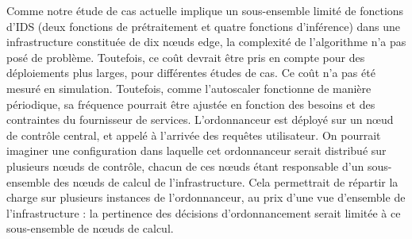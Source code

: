 {Comme notre étude de cas actuelle implique un sous-ensemble limité de fonctions d'IDS (deux fonctions de prétraitement et quatre fonctions d'inférence) dans une infrastructure constituée de dix nœuds edge, la complexité de l'algorithme n'a pas posé de problème. Toutefois, ce coût devrait être pris en compte pour des déploiements plus larges, pour différentes études de cas. Ce coût n'a pas été mesuré en simulation. Toutefois, comme l'autoscaler fonctionne de manière périodique, sa fréquence pourrait être ajustée en fonction des besoins et des contraintes du fournisseur de services. L'ordonnanceur est déployé sur un nœud de contrôle central, et appelé à l'arrivée des requêtes utilisateur. On pourrait imaginer une configuration dans laquelle cet ordonnanceur serait distribué sur plusieurs nœuds de contrôle, chacun de ces nœuds étant responsable d'un sous-ensemble des nœuds de calcul de l'infrastructure. Cela permettrait de répartir la charge sur plusieurs instances de l'ordonnanceur, au prix d'une vue d'ensemble de l'infrastructure : la pertinence des décisions d'ordonnancement serait limitée à ce sous-ensemble de nœuds de calcul.



}
